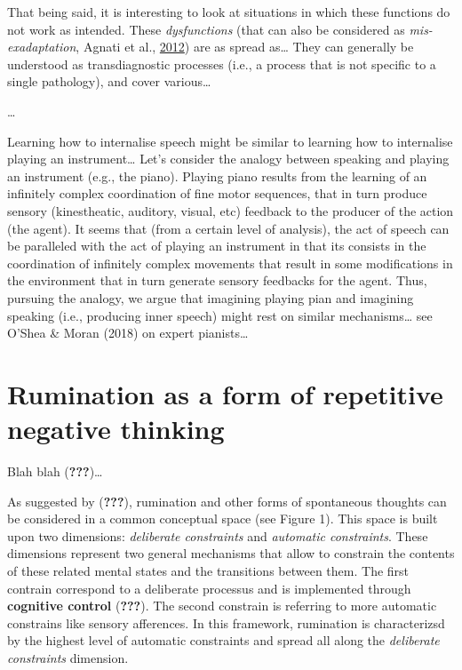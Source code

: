 \documentclass[a4paper,12pt,twoside,openright,oldfontcommands]{memoir}
\begin{document}
That being said, it is interesting to look at situations in which these
functions do not work as intended. These \emph{dysfunctions} (that can
also be considered as \emph{mis-exadaptation}, Agnati et al.,
\protect\hyperlink{ref-agnati_possible_2012}{2012}) are as spread
as\ldots{} They can generally be understood as transdiagnostic processes
(i.e., a process that is not specific to a single pathology), and cover
various\ldots{}

\ldots{}

Learning how to internalise speech might be similar to learning how to
internalise playing an instrument\ldots{} Let's consider the analogy
between speaking and playing an instrument (e.g., the piano). Playing
piano results from the learning of an infinitely complex coordination of
fine motor sequences, that in turn produce sensory (kinestheatic,
auditory, visual, etc) feedback to the producer of the action (the
agent). It seems that (from a certain level of analysis), the act of
speech can be paralleled with the act of playing an instrument in that
its consists in the coordination of infinitely complex movements that
result in some modifications in the environment that in turn generate
sensory feedbacks for the agent. Thus, pursuing the analogy, we argue
that imagining playing pian and imagining speaking (i.e., producing
inner speech) might rest on similar mechanisms\ldots{} see O'Shea \&
Moran (2018) on expert pianists\ldots{}

\section{Rumination as a form of repetitive negative
thinking}\label{rumination-as-a-form-of-repetitive-negative-thinking}

Blah blah ({\textbf{???}})\ldots{}

As suggested by ({\textbf{???}}), rumination and other forms of
spontaneous thoughts can be considered in a common conceptual space (see
Figure 1). This space is built upon two dimensions: \emph{deliberate
constraints} and \emph{automatic constraints}. These dimensions
represent two general mechanisms that allow to constrain the contents of
these related mental states and the transitions between them. The first
contrain correspond to a deliberate processus and is implemented through
\textbf{cognitive control} ({\textbf{???}}). The second constrain is
referring to more automatic constrains like sensory afferences. In this
framework, rumination is characterizsd by the highest level of automatic
constraints and spread all along the \emph{deliberate constraints}
dimension.
\end{document}

